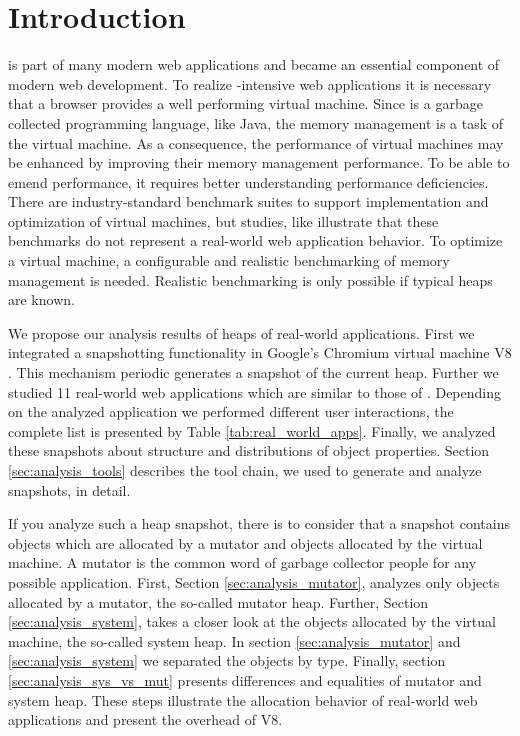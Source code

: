 
\section{Introduction}

\JS is part of many modern web applications and became an essential
component of modern web development. To realize \JS-intensive web applications
it is necessary that a browser provides a well performing \JS virtual machine.
Since \JS is a garbage collected programming language, like Java, the memory
management is a task of the virtual machine. As a consequence, the performance
of \JS virtual machines may be enhanced by improving their memory management
performance. To be able to emend performance, it requires better understanding
performance deficiencies. There are industry-standard benchmark suites to
support implementation and optimization of \JS virtual machines, but studies,
like \cite{JSMeter2009} illustrate that these benchmarks do not represent a
real-world web application behavior. To optimize a \JS virtual machine, a
configurable and realistic benchmarking of memory management is needed.
Realistic benchmarking is only possible if typical \JS heaps are known.

We propose our analysis results of \JS heaps of real-world applications. First
we integrated a snapshotting functionality in Google's Chromium \cite{Chromium}
virtual machine V8 \cite{V8}. This mechanism periodic generates a snapshot of
the current \JS heap. Further we studied 11 real-world web applications which
are similar to those of \cite{JSMeter2009}. Depending on the analyzed
application we performed different user interactions, the complete list is
presented by Table \ref{tab:real_world_apps}. Finally, we analyzed these
snapshots about structure and distributions of object properties. Section
\ref{sec:analysis_tools} describes the tool chain, we used to generate
and analyze snapshots, in detail.

If you analyze such a heap snapshot, there is to consider that a snapshot
contains objects which are allocated by a mutator and objects allocated by the
\JS virtual machine. A mutator is the common word of garbage collector people
for any possible application. First, Section \ref{sec:analysis_mutator},
analyzes only objects allocated by a mutator, the so-called mutator heap.
Further, Section \ref{sec:analysis_system}, takes a closer look at the objects
allocated by the virtual machine, the so-called system heap. In section
\ref{sec:analysis_mutator} and \ref{sec:analysis_system} we separated the
objects by type. Finally, section \ref{sec:analysis_sys_vs_mut} presents
differences and equalities of mutator and system heap. These steps illustrate
the allocation behavior of real-world web applications and present the overhead
of V8.

